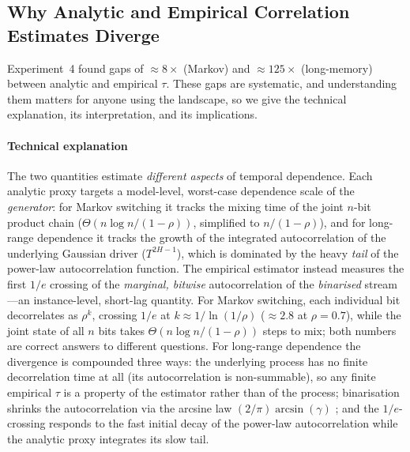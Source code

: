 \documentclass[sensors,article,submit,pdftex,moreauthors]{Definitions/mdpi}
\providecommand{\DIFadd}[1]{{\protect\color{blue}#1}} %
\providecommand{\DIFdel}[1]{} %
\providecommand{\DIFaddbegin}{} %
\providecommand{\DIFaddend}{} %
\providecommand{\DIFdelbegin}{} %
\providecommand{\DIFdelend}{} %
\begin{document}
\subsection{\DIFdelbegin \DIFdel{Limitations}\DIFdelend \DIFaddbegin \DIFadd{Why Analytic and Empirical Correlation Estimates Diverge}\DIFaddend }
\DIFaddbegin \label{sec:divergence}
\DIFaddend 

\DIFdelbegin %
\textbf{\DIFdel{No quantum simulation or implementation.}} %
\DIFdel{The study does not simulate quantum circuits and does not implement a quantum oracle sketching algorithm; quantum performance is reported only as heuristic proxies derived from }\DIFdelend \DIFaddbegin \DIFadd{Experiment~4 found gaps of ${\approx}8\times$ (Markov) and ${\approx}125\times$ (long-memory) between analytic and empirical $\tau$. These gaps are systematic, and understanding them matters for anyone using the landscape, so we give the technical explanation, its interpretation, and its implications.
}

\paragraph{\DIFadd{Technical explanation}} \DIFadd{The two quantities estimate }\emph{\DIFadd{different aspects}} \DIFadd{of temporal dependence. Each analytic proxy targets a model-level, worst-case dependence scale of the }\emph{\DIFadd{generator}}\DIFadd{: for Markov switching it tracks the mixing time of the joint $n$-bit product chain ($\Theta(n \log n/(1-\rho))$, simplified to $n/(1-\rho)$), and for long-range dependence it tracks the growth of the integrated autocorrelation of the underlying Gaussian driver ($T^{2H-1}$), which is dominated by the heavy }\emph{\DIFadd{tail}} \DIFadd{of the power-law autocorrelation function. The empirical estimator instead measures the first $1/e$ crossing of the }\emph{\DIFadd{marginal, bitwise}} \DIFadd{autocorrelation of the }\emph{\DIFadd{binarised}} \DIFadd{stream---an instance-level, short-lag quantity. For Markov switching, each individual bit decorrelates as $\rho^{k}$, crossing $1/e$ at $k \approx 1/\ln(1/\rho)$ ($\approx 2.8$ at $\rho = 0.7$), while the joint state of all $n$ bits takes $\Theta(n \log n/(1-\rho))$ steps to mix; both numbers are correct answers to different questions. For long-range dependence the divergence is compounded three ways: the underlying process has no finite decorrelation time at all (its autocorrelation is non-summable), so any finite empirical $\tau$ is a property of the estimator rather than of the process; binarisation shrinks the autocorrelation via the arcsine law $(2/\pi)\arcsin(\gamma)$ }\citep{vanvleck1966spectrum}\DIFadd{; and the $1/e$-crossing responds to the fast initial decay of the power-law autocorrelation while the analytic proxy integrates its slow tail.
}
\end{document}
